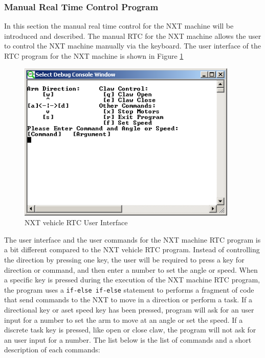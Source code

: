 \documentclass[11pt]{article}
\begin{document}
\subsubsection{Manual Real Time Control Program}
In this section the manual real time control for the NXT machine will be introduced and described.
The manual RTC for the NXT machine allows the user to control the NXT machine manually via the keyboard.
The user interface of the RTC program for the NXT machine is shown in Figure \ref{fig_mach_UI}
\begin{figure}[h]
  \begin{center}
    \includegraphics[height=3in]{figure/mindstorm/mach_UI.png}
    \caption{NXT vehicle RTC User Interface \label{fig_mach_UI}}
  \end{center}
\end{figure}
The user interface and the user commands for the NXT machine RTC program is a bit different compared to the
NXT vehicle RTC program. Instead of controlling the direction by pressing one key, the user will be required 
to press a key for direction or command, and then enter a number to set the angle or speed. When a specific 
key is pressed during the execution of the NXT machine RTC program, the program uses a \verb+if-else if-else+ 
statement to performs a fragment of code that send commands to the NXT to move in a direction or perform a task.
If a directional key or aset speed key has been pressed, program will ask for an user input for a number to set 
the arm to move at an angle or set the speed. If a discrete task key is pressed, like open or close claw, the 
program will not ask for an user input for a number. The list below is the list of commands and a short 
description of each commands:
\end{document}
